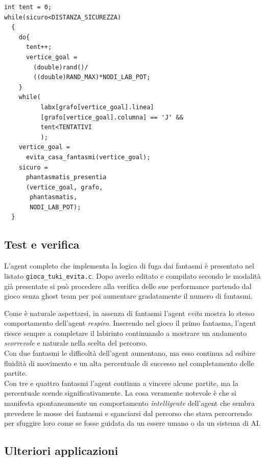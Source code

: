 \documentclass[8pt]{book}
\begin{document}
\begin{spacing}{0.9}
  \begin{small}
    \begin{tcolorbox}
\begin{verbatim}
int tent = 0;
while(sicuro<DISTANZA_SICUREZZA)
  {
    do{
      tent++;
      vertice_goal = 
        (double)rand()/
        ((double)RAND_MAX)*NODI_LAB_POT;
    }
    while(
          labx[grafo[vertice_goal].linea]
          [grafo[vertice_goal].columna] == 'J' &&
          tent<TENTATIVI
          );
    vertice_goal = 
      evita_casa_fantasmi(vertice_goal);
    sicuro = 
      phantasmatis_presentia 
      (vertice_goal, grafo,
       phantasmatis,
       NODI_LAB_POT);
  }
\end{verbatim}
  \end{tcolorbox}
    \end{small}
      \end{spacing}

\subsection{Test e verifica}

L'agent completo che implementa la logica di fuga dai fantasmi è presentato nel listato \texttt{gioca\_tuki\_evita.c}. Dopo averlo editato e compilato secondo le modalità già presentate si può procedere alla verifica delle sue performance partendo dal gioco senza ghost team per poi aumentare gradatamente il numero di fantasmi.

Come è naturale aspettarsi, in assenza di fantasmi l'agent \emph{evita} mostra lo stesso comportamento dell'agent \emph{respiro}. Inserendo nel gioco il primo fantasma, l'agent riesce sempre a completare il labirinto continuando a mostrare un andamento \emph{scorrevole} e naturale nella scelta del percorso.\\
Con due fantasmi le difficoltà dell'agent aumentano, ma esso continua ad esibire fluidità di movimento e un alta percentuale di successo nel completamento delle partite.\\
Con tre e quattro fantasmi l'agent continua a vincere alcune partite, ma la percentuale scende significativamente. La cosa veramente notevole è che si manifesta spontaneamente un comportamento \emph{intelligente} dell'agent che sembra prevedere le mosse dei fantasmi e sganciarsi dal percorso che stava percorrendo per sfuggire loro come se fosse guidata da un essere umano o da un sistema di AI.

\subsection{Ulteriori applicazioni}
\end{document}
